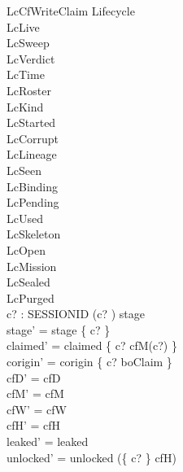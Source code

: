 \documentclass[a4paper,10pt,fleqn]{article}
\begin{document}
\begin{schema}{LcCfWriteClaim}
\Delta Lifecycle \\
\Xi LcLive \\
\Xi LcSweep \\
\Xi LcVerdict \\
\Xi LcTime \\
\Xi LcRoster \\
\Xi LcKind \\
\Xi LcStarted \\
\Xi LcCorrupt \\
\Xi LcLineage \\
\Xi LcSeen \\
\Xi LcBinding \\
\Xi LcPending \\
\Xi LcUsed \\
\Xi LcSkeleton \\
\Xi LcOpen \\
\Xi LcMission \\
\Xi LcSealed \\
\Xi LcPurged \\
c? : SESSIONID
\where
(c? ) \in stage \\
stage' = stage \oplus \{ c?  \} \\
claimed' = claimed \oplus \{ c? \mapsto cfM(c?) \} \\
corigin' = corigin \oplus \{ c? \mapsto boClaim \} \\
cfD' = cfD \\
cfM' = cfM \\
cfW' = cfW \\
cfH' = cfH \\
leaked' = leaked \\
unlocked' = unlocked \cup (\{ c? \} \setminus cfH)
\end{schema}
\end{document}
